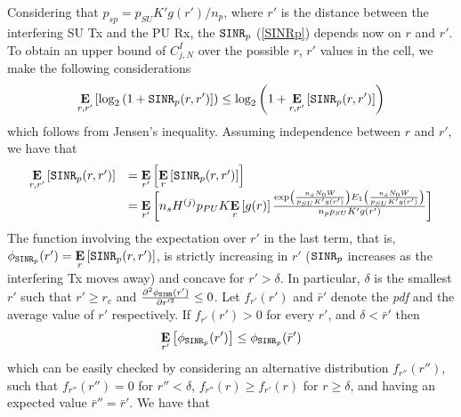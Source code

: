 Considering that $p_{sp}=p_{SU}K'g(r')/n_{p}$, where $r'$ is the distance between the interfering SU Tx and the PU Rx, the $\text{\ttfamily{SINR}}_{p}$ (\ref{SINRp}) depends now on $r$ and $r'$. To obtain an upper bound of $C^{I}_{j,N}$ over the possible $r$, $r'$ values in the cell, we make the following considerations
\begin{equation}
\underset{r,r'}{\mathbf{E}}\left[\text{log}_{2}\left(1+\text{\ttfamily{SINR}}_{p}(r,r')\right]\right) \leq \\
\text{log}_{2}\left(1+\underset{r,r'}{\mathbf{E}}\left[\text{\ttfamily{SINR}}_{p}(r,r')\right]\right)
\end{equation}
which follows from Jensen's inequality. Assuming independence between $r$ and $r'$, we have that
\begin{equation}\label{E_SINRp}
\begin{array}{ll}
\underset{r,r'}{\mathbf{E}}\left[\text{\ttfamily{SINR}}_{p}(r,r')\right] & =
\underset{r'}{\mathbf{E}}\left[\underset{r}{\mathbf{E}}\left[\text{\ttfamily{SINR}}_{p}(r,r')\right]\right] \\
& = \underset{r'}{\mathbf{E}}\left[n_{s}H^{(j)}p_{PU}K\underset{r}{\mathbf{E}}\left[g(r)\right]
\frac{\text{exp}\left(\frac{n_{s}N_{0}W}{p_{SU}K'g(r')}\right) E_{1}\left(\frac{n_{s}N_{0}W}{p_{SU}K'g(r')}\right)}{n_{p}p_{SU}K'g(r')}\right]
\end{array}
\end{equation}
The function involving the expectation over $r'$ in the last term, that is, $\phi_{\text{\ttfamily{SINR}}_{p}}(r') = \underset{r}{\mathbf{E}}\left[\text{\ttfamily{SINR}}_{p}(r,r')\right]$, is strictly increasing in $r'$ ($\text{\ttfamily{SINR}}_{p}$ increases as the interfering Tx moves away) and concave for $r'>\delta$.
In particular, $\delta$ is the smallest $r'$ such that $r' \geq r_{c}$ and $\frac{\partial^{2}\phi_\text{\ttfamily{SINR}}(r')}{\partial r'^{2}} \leq 0$.
Let $f_{r'}(r')$ and $\bar{r}'$ denote the \textit{pdf} and the average value of $r'$ respectively. 
If $f_{r'}(r')>0$ for every $r'$, and $\delta<\bar{r}'$ then
\begin{equation}
\underset{r'}{\mathbf{E}}\left[\phi_{\text{\ttfamily{SINR}}_{p}}(r')\right] \leq
\phi_{\text{\ttfamily{SINR}}_{p}}(\bar{r}')
\end{equation}
which can be easily checked by considering an alternative distribution $f_{r''}(r'')$, such that $f_{r''}(r'')=0$ for $r''<\delta$, $f_{r''}(r)\geq f_{r'}(r)$ for $r\geq\delta$, and having an expected value $\bar{r}''=\bar{r}'$. We have that
